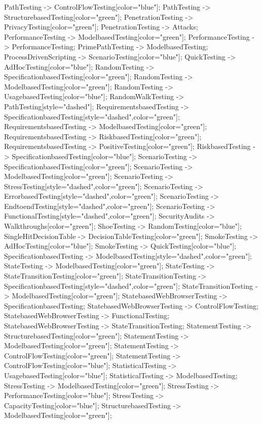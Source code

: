 \documentclass{article}
\begin{document}
{PathTesting -> ControlFlowTesting[color="blue"];
PathTesting -> StructurebasedTesting[color="green"];
PenetrationTesting -> PrivacyTesting[color="green"];
PenetrationTesting -> Attacks;
PerformanceTesting -> ModelbasedTesting[color="green"];
PerformanceTesting -> PerformanceTesting;
PrimePathTesting -> ModelbasedTesting;
ProcessDrivenScripting -> ScenarioTesting[color="blue"];
QuickTesting -> AdHocTesting[color="blue"];
RandomTesting -> SpecificationbasedTesting[color="green"];
RandomTesting -> ModelbasedTesting[color="green"];
RandomTesting -> UsagebasedTesting[color="blue"];
RandomWalkTesting -> PathTesting[style="dashed"];
RequirementsbasedTesting -> SpecificationbasedTesting[style="dashed",color="green"];
RequirementsbasedTesting -> ModelbasedTesting[color="green"];
RequirementsbasedTesting -> RiskbasedTesting[color="green"];
RequirementsbasedTesting -> PositiveTesting[color="green"];
RiskbasedTesting -> SpecificationbasedTesting[color="blue"];
ScenarioTesting -> SpecificationbasedTesting[color="green"];
ScenarioTesting -> ModelbasedTesting[color="green"];
ScenarioTesting -> StressTesting[style="dashed",color="green"];
ScenarioTesting -> ErrorbasedTesting[style="dashed",color="green"];
ScenarioTesting -> EndtoendTesting[style="dashed",color="green"];
ScenarioTesting -> FunctionalTesting[style="dashed",color="green"];
SecurityAudits -> Walkthroughs[color="green"];
ShoeTesting -> RandomTesting[color="blue"];
SingleHitDecisionTable -> DecisionTableTesting[color="green"];
SmokeTesting -> AdHocTesting[color="blue"];
SmokeTesting -> QuickTesting[color="blue"];
SpecificationbasedTesting -> ModelbasedTesting[style="dashed",color="green"];
StateTesting -> ModelbasedTesting[color="green"];
StateTesting -> StateTransitionTesting[color="green"];
StateTransitionTesting -> SpecificationbasedTesting[style="dashed",color="green"];
StateTransitionTesting -> ModelbasedTesting[color="green"];
StatebasedWebBrowserTesting -> SpecificationbasedTesting;
StatebasedWebBrowserTesting -> ControlFlowTesting;
StatebasedWebBrowserTesting -> FunctionalTesting;
StatebasedWebBrowserTesting -> StateTransitionTesting;
StatementTesting -> StructurebasedTesting[color="green"];
StatementTesting -> ModelbasedTesting[color="green"];
StatementTesting -> ControlFlowTesting[color="green"];
StatementTesting -> ControlFlowTesting[color="blue"];
StatisticalTesting -> UsagebasedTesting[color="blue"];
StatisticalTesting -> ModelbasedTesting;
StressTesting -> ModelbasedTesting[color="green"];
StressTesting -> PerformanceTesting[color="blue"];
StressTesting -> CapacityTesting[color="blue"];
StructurebasedTesting -> ModelbasedTesting[color="green"];
}
\end{document}
